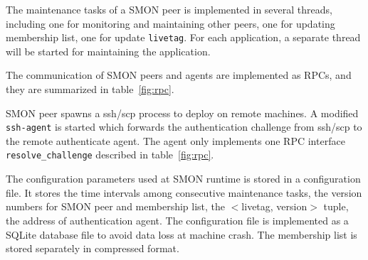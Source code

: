 The maintenance tasks of a SMON peer is implemented in
several threads, including one for monitoring and
maintaining other peers, one for updating membership list,
one for update \texttt{livetag}. For each application, a
separate thread will be started for maintaining the
application.

The communication of SMON peers and agents are implemented
as RPCs, and they are summarized in table~\ref{fig:rpc}.

SMON peer spawns a ssh/scp process to deploy on remote
machines. A modified \texttt{ssh-agent} is started which
forwards the authentication challenge from ssh/scp to the
remote authenticate agent. The agent only implements one RPC
interface \texttt{resolve\_challenge} described in
table~\ref{fig:rpc}.

The configuration parameters used at SMON runtime is stored
in a configuration file. It stores the time intervals among
consecutive maintenance tasks, the version numbers for SMON
peer and membership list, the $<$livetag, version$>$ tuple,
the address of authentication agent. The configuration file
is implemented as a SQLite database file to avoid data loss
at machine crash. The membership list is stored separately
in compressed format.



